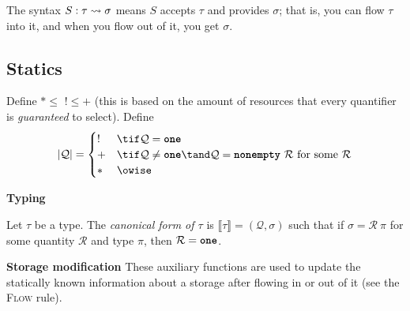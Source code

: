 \documentclass[10pt]{article}
\begin{document}
The syntax $S : \tau \transforms \sigma$ means $S$ accepts $\tau$ and provides $\sigma$; that is, you can flow $\tau$ into it, and when you flow out of it, you get $\sigma$.

\subsection{Statics}
Define $* \leq \,\, ! \leq +$ (this is based on the amount of resources that every quantifier is \emph{guaranteed} to select).
Define
\begin{align*}
    |\mathcal{Q}| =
    \begin{cases}
        ! & \tif \mathcal{Q} = \one \\
        + & \tif \mathcal{Q} \neq \one \tand \mathcal{Q} = \nonempty~\mathcal{R}~\text{for some}~\mathcal{R} \\
        * & \owise
    \end{cases}
\end{align*}

 \textbf{Typing}
\begin{mathpar}


\end{mathpar}

\begin{definition}
    Let $\tau$ be a type.
    The \emph{canonical form of $\tau$} is $\llbracket \tau \rrbracket = (\mathcal{Q}, \sigma)$ such that if $\sigma = \mathcal{R}~\pi$ for some quantity $\mathcal{R}$ and type $\pi$, then $\mathcal{R} = \one$.
\end{definition}

 \textbf{Storage modification}
These auxiliary functions are used to update the statically known information about a storage after flowing in or out of it (see the \textsc{Flow} rule).
\end{document}
